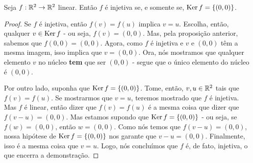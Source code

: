 \begin{prop}
	Seja $f:\mathbb R^2\to\mathbb R^2$ linear. Então $f$ é injetiva se, e somente se, $\operatorname{Ker} f=\{(0,0)\}$.
\end{prop}

\begin{proof}
	Se $f$ é injetiva, então $f(v)=f(u)$ implica $v=u$. Escolha, então, qualquer $v\in \operatorname{Ker} f$ - ou seja, $f(v)=(0,0)$. Mas, pela proposição anterior, sabemos que $f(0,0)=(0,0)$. Agora, como $f$ é injetiva e $v$ e $(0,0)$ têm a mesma imagem, isso implica que $v=(0,0)$. Ora, nós mostramos que qualquer elemento $v$ no núcleo \textbf{tem} que ser $(0,0)$ - segue que o único elemento do núcleo é $(0,0)$.
	
	Por outro lado, suponha que $\operatorname{Ker} f=\{(0,0)\}$. Tome, então, $v,u\in\mathbb R^2$ tais que $f(v)=f(u)$. Se mostrarmos que $v=u$, teremos mostrado que $f$ é injetiva. Mas $f$ é linear, então dizer que $f(v)=f(u)$ é a mesma coisa que dizer que $f(v-u)=(0,0)$. Mas estamos supondo que $\operatorname{Ker} f=\{(0,0)\}$ - ou seja, se $f(w)=(0,0)$, então $w=(0,0)$. Como nós temos que $f(v-u)=(0,0)$, nossa hipótese de $\operatorname{Ker} f=\{(0,0)\}$ nos garante que $v-u=(0,0)$. Finalmente, isso é a mesma coisa que $v=u$. Logo, nós concluímos que $f$ é, de fato, injetiva, o que encerra a demonstração.
\end{proof}

